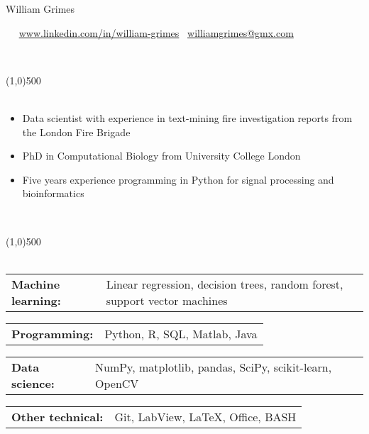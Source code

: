 \documentclass[11pt]{res}
\begin{document}
\centerline{{\Huge William Grimes}}
\vspace{-0.7em}


\Mobilefone \ \textcolor{mygray}{                \hfill}
\ComputerMouse \ \url{www.linkedin.com/in/william-grimes} \hfill 
\Letter \ \href{mailto:williamgrimes@gmx.com}{williamgrimes@gmx.com}

\vspace{-1.0em}
\begin{flushleft}
\\
\end{flushleft}
\vspace{-3.2em}

\line(1,0){500}\\\smallskip
\vspace*{-0.8cm}
\nolinebreak\\
\textcolor{mygray}{
\begin{itemize} %
	\item Data scientist with experience in text-mining fire investigation reports from the London Fire Brigade
	\item PhD in Computational Biology from University College London 
	\item Five years experience programming in Python for signal processing and bioinformatics
\end{itemize}
}

\vspace{-1.2em}
\begin{flushleft}
\\
\end{flushleft}
\vspace{-3.2em}
\line(1,0){500}\\
\vspace*{-0.3cm}
\nolinebreak\\
\begin{tabular}{@{} p{3.3cm} p{14.0cm} @{}} {\bf Machine learning:} & \textcolor{mygray}{Linear regression, decision trees, random forest, support vector machines} \end{tabular}
\begin{tabular}{@{} p{3.3cm} p{14.0cm} @{}} {\bf Programming:} & \textcolor{mygray}{Python, R, SQL, Matlab, Java}\end{tabular}
\begin{tabular}{@{} p{3.3cm} p{14.0cm} @{}} {\bf Data science:} & \textcolor{mygray}{NumPy, matplotlib, pandas, SciPy, scikit-learn, OpenCV }\end{tabular}
\begin{tabular}{@{} p{3.3cm} p{14.0cm} @{}} {\bf Other technical:} & \textcolor{mygray}{ Git, LabView, \LaTeX, Office, BASH} \end{tabular}
\end{document}
